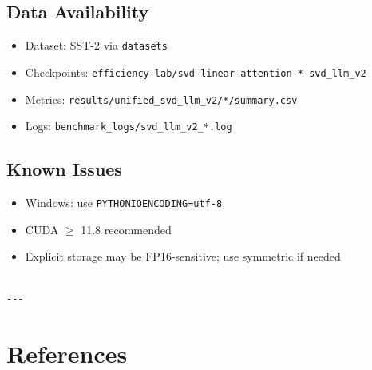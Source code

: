 \subsection{Data Availability}

\begin{itemize}
\item Dataset: SST-2 via \texttt{datasets}
\item Checkpoints: \texttt{efficiency-lab/svd-linear-attention-*-svd\_llm\_v2}
\item Metrics: \texttt{results/unified\_svd\_llm\_v2/*/summary.csv}
\item Logs: \texttt{benchmark\_logs/svd\_llm\_v2\_*.log}

\end{itemize}
\subsection{Known Issues}

\begin{itemize}
\item Windows: use \texttt{PYTHONIOENCODING=utf-8}
\item CUDA $\ge$ 11.8 recommended
\item Explicit storage may be FP16-sensitive; use symmetric if needed
\end{itemize}
\begin{lstlisting}

---
\end{lstlisting}


\section{References}

